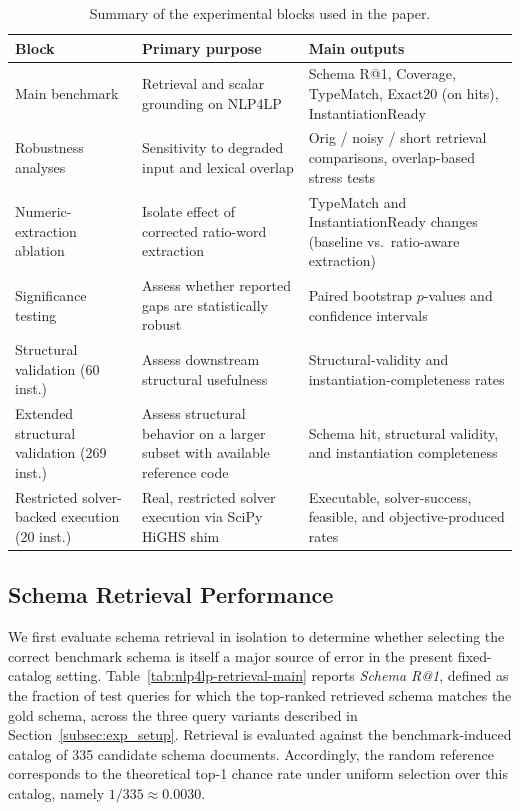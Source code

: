 \documentclass[3p]{elsarticle}
\begin{document}
\begin{table}[t]
\centering
\caption{Summary of the experimental blocks used in the paper.}
\label{tab:exp_blocks}
\small
\begin{tabularx}{\linewidth}{X X X}
\toprule
Block & Primary purpose & Main outputs \\
\midrule
Main benchmark & Retrieval and scalar grounding on \textsc{NLP4LP} & Schema R@1, Coverage, TypeMatch, Exact20 (on hits), InstantiationReady \\
Robustness analyses & Sensitivity to degraded input and lexical overlap & Orig / noisy / short retrieval comparisons, overlap-based stress tests \\
Numeric-extraction ablation & Isolate effect of corrected ratio-word extraction & TypeMatch and InstantiationReady changes (baseline vs.\ ratio-aware extraction) \\
Significance testing & Assess whether reported gaps are statistically robust & Paired bootstrap $p$-values and confidence intervals \\
Structural validation (60 inst.) & Assess downstream structural usefulness & Structural-validity and instantiation-completeness rates \\
Extended structural validation (269 inst.) & Assess structural behavior on a larger subset with available reference code & Schema hit, structural validity, and instantiation completeness \\
Restricted solver-backed execution (20 inst.) & Real, restricted solver execution via SciPy HiGHS shim & Executable, solver-success, feasible, and objective-produced rates \\
\bottomrule
\end{tabularx}
\end{table}

\subsection{Schema Retrieval Performance}
\label{subsec:exp_retrieval}

We first evaluate schema retrieval in isolation to determine whether selecting the correct benchmark schema is itself a major source of error in the present fixed-catalog setting. Table~\ref{tab:nlp4lp-retrieval-main} reports \textit{Schema R@1}, defined as the fraction of test queries for which the top-ranked retrieved schema matches the gold schema, across the three query variants described in Section~\ref{subsec:exp_setup}. Retrieval is evaluated against the benchmark-induced catalog of 335 candidate schema documents. Accordingly, the random reference corresponds to the theoretical top-1 chance rate under uniform selection over this catalog, namely $1/335 \approx 0.0030$.
\end{document}
